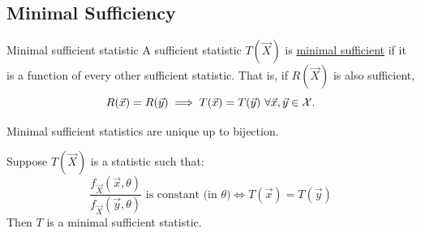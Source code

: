 \documentclass[../Main.tex]{subfiles}
\begin{document}
\subsection{Minimal Sufficiency}
\begin{definition}{Minimal sufficient statistic}
    A sufficient statistic $T(\vec{X})$ is \underline{minimal sufficient} if it is a function of every other sufficient statistic. That is, if $R(\vec{X})$ is also sufficient,
    \begin{equation*}
        R(\vec{x}) = R(\vec{y}) \implies T(\vec{x}) = T(\vec{y})~\forall \vec{x}, \vec{y} \in \mathcal{X}.
    \end{equation*}
\end{definition}
\begin{remark}
    Minimal sufficient statistics are unique up to bijection.
\end{remark}
\begin{theorem}
    Suppose $T(\vec{X})$ is a statistic such that:
    \begin{equation*}
        \frac{f_{\vec{X}}(\vec{x}, \theta)}{f_{\vec{X}}(\vec{y}, \theta)} \text{ is constant (in $\theta$)} \iff T(\vec{x}) = T(\vec{y})
    \end{equation*}
    Then $T$ is a minimal sufficient statistic.
    \label{thmMinCriterion}
\end{theorem}
\end{document}
